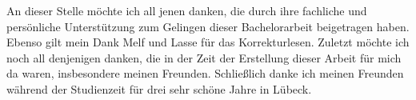 \documentclass[
11pt, %
ngerman, %
singlespacing, %
headsepline, %
]{MastersDoctoralThesis} %
\begin{document}
\begin{acknowledgements}
An dieser Stelle möchte ich all jenen danken, die durch ihre fachliche und persönliche Unterstützung zum Gelingen dieser Bachelorarbeit beigetragen haben. \newline \newline
Ebenso gilt mein Dank Melf und Lasse für das Korrekturlesen. Zuletzt möchte ich noch all denjenigen danken, die in der Zeit der Erstellung dieser Arbeit für mich da waren, insbesondere meinen Freunden. \newline \newline
Schließlich danke ich meinen Freunden während der Studienzeit für drei sehr schöne Jahre in Lübeck.
\end{acknowledgements}

\mainmatter %

\pagestyle{thesis} %


 

% 
% 


\appendix %


%
%
%


\printbibliography[heading=bibintoc]

\end{document}
